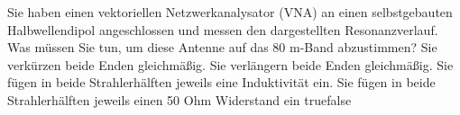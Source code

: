    {Sie haben einen vektoriellen Netzwerkanalysator (VNA) an einen selbstgebauten Halbwellendipol angeschlossen und messen den dargestellten Resonanzverlauf. Was müssen Sie tun, um diese Antenne auf das 80 m-Band abzustimmen? }
    {Sie verkürzen beide Enden gleichmäßig.}
    {Sie verlängern beide Enden gleichmäßig.}
    {Sie fügen in beide Strahlerhälften jeweils eine Induktivität ein.}
    {Sie fügen in beide Strahlerhälften jeweils einen 50 Ohm Widerstand ein}
    {true}{false}